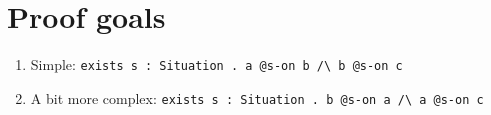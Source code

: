 \section{Proof goals}

\begin{enumerate}[leftmargin=*]

\item Simple: \lstinline!exists s : Situation . a @s-on b /\ b @s-on c!
  
\item A bit more complex: \lstinline!exists s : Situation . b @s-on a /\ a @s-on c!
  
\end{enumerate}


